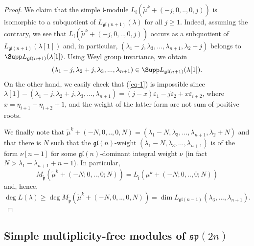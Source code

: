 \documentclass[12pt]{amsart}
\def\gl{\mathfrak{l}}
\begin{document}
\begin{proof}
We claim that the simple $\gl$-module $L_{\gl}  (\widetilde{\mu}^k + (-j,0,..,0,j))$ is isomorphic to a subquotient of $L_{\mathfrak{gl}({n+1})}(\lambda)$ for all $j\geq 1$. Indeed, assuming the contrary, we see that  $L_{\gl}  (\widetilde{\mu}^k + (-j,0,..,0,j))$ occurs as a subquotient of $L_{\mathfrak{gl}({n+1})}(\lambda[1])$ and, in particular, 
$(\lambda_1 - j, \lambda_3,...,\lambda_{n+1}, \lambda_2+j)$ belongs to  $\Supp L_{\mathfrak{gl}({n+1})}(\lambda[1])$. Using Weyl group invariance, we obtain
\begin{equation} \label{eq-1}
(\lambda_1 - j, \lambda_2 + j, \lambda_3,...,\lambda_{n+1}) \in \Supp L_{\mathfrak{gl}({n+1})}(\lambda[1]).
\end{equation}
On the other hand, we easily check that (\ref{eq-1}) is impossible since $\lambda[1] - (\lambda_1 - j, \lambda_2 + j, \lambda_3,...,\lambda_{n+1}) = (j-x)\varepsilon_1 -j\varepsilon_2 + x \varepsilon_{i+2}$, where $x = \eta_{i+1} - \eta_{i+2} + 1$, and the weight of the latter form are not sum of positive roots. 

We finally note that $\widetilde{\mu}^k + (-N,0,..,0,N) = (\lambda_1-N,\lambda_3,...,\lambda_{n+1}, \lambda_2+N)
$ and that there is $N$ such that 
  the $\mathfrak{gl}(n)$-weight $(\lambda_1-N,\lambda_3,...,\lambda_{n+1})$  is of the form $\nu[n-1]$ for some $\mathfrak{gl}(n)$-dominant integral weight $\nu$ (in fact $N>\lambda_1 - \lambda_{n+1} + n-1$). In particular, 
$$M_{\widetilde{\mathfrak p}} (\widetilde{\mu}^k + (-N;0,..,0;N)) = L_{\widetilde{\gl}} ({\mu}^k + (-N;0,..,0;N))
$$
and, hence,
$$
\deg L(\lambda) \geq \deg M_{\widetilde{\mathfrak p}} (\widetilde{\mu}^k + (-N,0,..,0,N)) =  \dim L_{\mathfrak{gl}({n-1})}(\lambda_3,...,\lambda_{n+1}).
$$
\end{proof}



\subsection{Simple multiplicity-free modules of $\mathfrak{sp}({2n})$}
\end{document}
